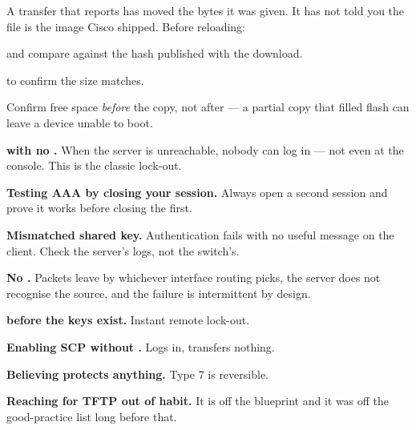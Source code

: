 \begin{conceptbox}
A transfer that reports \cmd{[OK]} has moved the bytes it was given. It has not
told you the file is the image Cisco shipped. Before reloading:

\begin{tight}
  \item {} and compare against
        the hash published with the download.
  \item {} to confirm the size matches.
  \item Confirm free space \emph{before} the copy, not after --- a partial copy
        that filled flash can leave a device unable to boot.
\end{tight}
\end{conceptbox}

\begin{pitfall}
\begin{tight}
  \item \textbf{ with no
        .} When the server is unreachable, nobody can log in --- not
        even at the console. This is the classic lock-out.
  \item \textbf{Testing AAA by closing your session.} Always open a second
        session and prove it works before closing the first.
  \item \textbf{Mismatched shared key.} Authentication fails with no useful
        message on the client. Check the server's logs, not the switch's.
  \item \textbf{No .} Packets leave by whichever
        interface routing picks, the server does not recognise the source, and
        the failure is intermittent by design.
  \item \textbf{ before the keys exist.} Instant remote
        lock-out.
  \item \textbf{Enabling SCP without .} Logs in,
        transfers nothing.
  \item \textbf{Believing  protects anything.}
        Type 7 is reversible.
  \item \textbf{Reaching for TFTP out of habit.} It is off the blueprint and it
        was off the good-practice list long before that.
\end{tight}
\end{pitfall}

